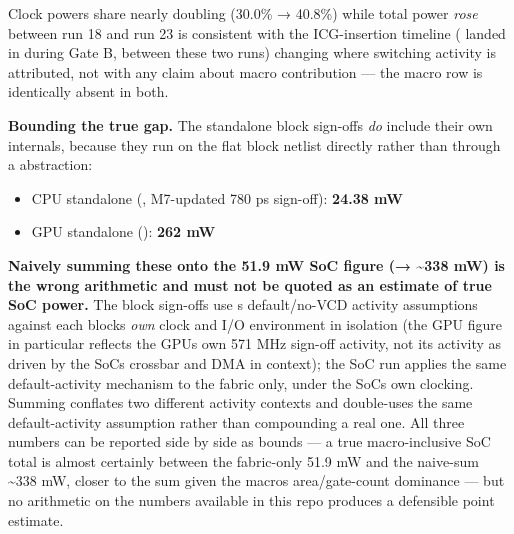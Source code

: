 \begin{record}
Clock power\textquotesingle s share nearly doubling (30.0\% → 40.8\%)
while total power \emph{rose} between run 18 and run 23 is consistent
with the ICG-insertion timeline ( landed in
 during  Gate B, between these two runs)
changing where switching activity is attributed, not with any claim
about macro contribution --- the macro row is identically absent in
both.

\textbf{Bounding the true gap.} The standalone block sign-offs \emph{do}
include their own internals, because they run  on the
flat block netlist directly rather than through a
 abstraction:

\begin{itemize}
\tightlist
\item
  CPU standalone (, M7-updated 780 ps sign-off):
  \textbf{24.38 mW}
\item
  GPU standalone (): \textbf{262 mW}
\end{itemize}

\textbf{Naively summing these onto the 51.9 mW SoC figure (→
\textasciitilde338 mW) is the wrong arithmetic and must not be quoted as
an estimate of true SoC power.} The block sign-offs use
\textquotesingle s default/\allowbreak{}no-VCD
activity assumptions against each block\textquotesingle s \emph{own}
clock and I/O environment in isolation (the GPU figure in particular
reflects the GPU\textquotesingle s own 571 MHz sign-off activity, not
its activity as driven by the SoC\textquotesingle s crossbar and DMA in
context); the SoC run applies the same default-activity mechanism to the
fabric only, under the SoC\textquotesingle s own clocking. Summing
conflates two different activity contexts and double-uses the same
default-activity assumption rather than compounding a real one. All
three numbers can be reported side by side as bounds --- a true
macro-inclusive SoC total is almost certainly between the fabric-only
51.9 mW and the naive-sum \textasciitilde338 mW, closer to the sum given
the macros\textquotesingle{} area/\allowbreak{}gate-count dominance ---
but no arithmetic on the numbers available in this repo produces a
defensible point estimate.


\end{record}
